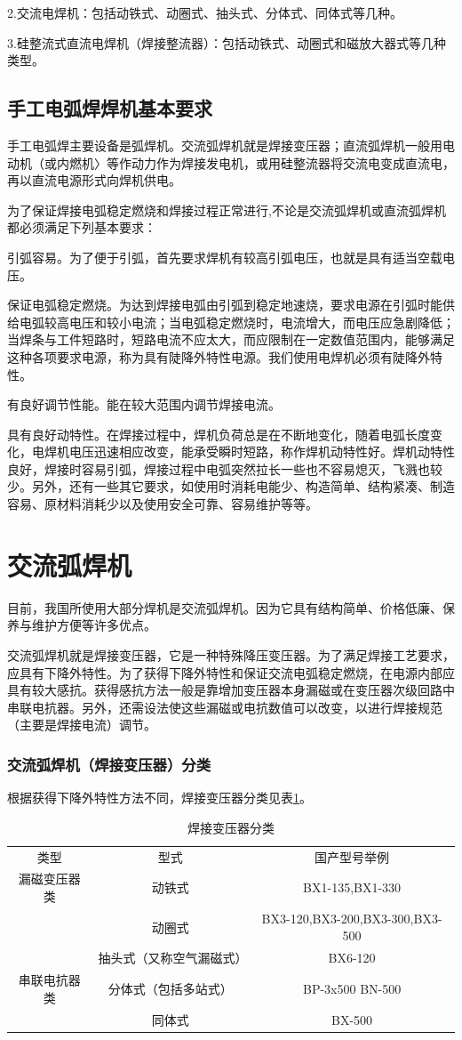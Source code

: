 \documentclass{ctexbook}
\begin{document}
2.交流电焊机：包括动铁式、动圈式、抽头式、分体式、同体式等几种。

3.硅整流式直流电焊机（焊接整流器）：包括动铁式、动圈式和磁放大器式等几种类型。
\subsection{手工电弧焊焊机基本要求}
手工电弧焊主要设备是弧焊机。交流弧焊机就是焊接变压器；直流弧焊机一般用电动机（或内燃机〉等作动力作为焊接发电机，或用硅整流器将交流电变成直流电，再以直流电源形式向焊机供电。

为了保证焊接电弧稳定燃烧和焊接过程正常进行,不论是交流弧焊机或直流弧焊机都必须满足下列基本要求：

引弧容易。为了便于引弧，首先要求焊机有较高引弧电压，也就是具有适当空载电压。

保证电弧稳定燃烧。为达到焊接电弧由引弧到稳定地速烧，要求电源在引弧时能供给电弧较高电压和较小电流；当电弧稳定燃烧时，电流增大，而电压应急剧降低；当焊条与工件短路时，短路电流不应太大，而应限制在一定数值范围内，能够满足这种各项要求电源，称为具有陡降外特性电源。我们使用电焊机必须有陡降外特性。

有良好调节性能。能在较大范围内调节焊接电流。

具有良好动特性。在焊接过程中，焊机负荷总是在不断地变化，随着电弧长度变化，电焊机电压迅速相应改变，能承受瞬时短路，称作焊机动特性好。焊机动特性良好，焊接时容易引弧，焊接过程中电弧突然拉长一些也不容易熄灭，飞溅也较少。另外，还有一些其它要求，如使用时消耗电能少、构造简单、结构紧凑、制造容易、原材料消耗少以及使用安全可靠、容易维护等等。
\section{交流弧焊机}
目前，我国所使用大部分焊机是交流弧焊机。因为它具有结构简单、价格低廉、保养与维护方便等许多优点。

交流弧焊机就是焊接变压器，它是一种特殊降压变压器。为了满足焊接工艺要求，应具有下降外特性。为了获得下降外特性和保证交流电弧稳定燃烧，在电源内部应具有较大感抗。获得感抗方法一般是靠增加变压器本身漏磁或在变压器次级回路中串联电抗器。另外，还需设法使这些漏磁或电抗数值可以改变，以进行焊接规范（主要是焊接电流）调节。
\subsubsection{交流弧焊机（焊接变压器）分类}
根据获得下降外特性方法不同，焊接变压器分类见表\ref{tab:banyaqifenlei}。
\begin{table}[htbp]
	\centering
	\caption{焊接变压器分类}
	\begin{tabular}{ccc}
		类型    & 型式    & 国产型号举例 \\
		漏磁变压器类 & 动铁式   & BX1-135,BX1-330 \\
		& 动圈式   & BX3-120,BX3-200,BX3-300,BX3-500 \\
		& 抽头式（又称空气漏磁式） & BX6-120 \\
		串联电抗器类 & 分体式（包括多站式） & BP-3x500 BN-500 \\
		& 同体式   & BX-500 \\
	\end{tabular}%
	\label{tab:banyaqifenlei}%
\end{table}%
\end{document}
